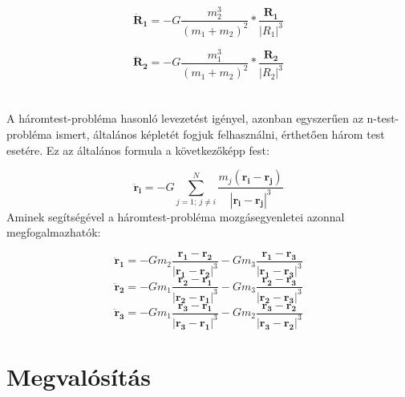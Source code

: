 \begin{multicols}{2}
\begin{equation} \label{eq:22}
    \boldsymbol{\ddot{R}_{1}}
    =
    - G \frac{m_{2}^{3}}{\left( m_{1} + m_{2} \right)^{2}} * \frac{\boldsymbol{R_{1}}}{\left| R_{1} \right|^{3}} 
\end{equation}

\begin{equation} \label{eq:23}
    \boldsymbol{\ddot{R}_{2}}
    =
    - G \frac{m_{1}^{3}}{\left( m_{1} + m_{2} \right)^{2}} * \frac{\boldsymbol{R_{2}}}{\left| R_{2} \right|^{3}}
\end{equation}
\\ \\
A háromtest-probléma hasonló levezetést igényel, azonban egyszerűen az n-test-probléma ismert, általános képletét fogjuk felhasználni, érthetően három test esetére. Ez az általános formula a következőképp fest:

\begin{equation}
    \boldsymbol{\ddot{r}_{i}}
    =
    - G \sum_{j = 1;\ j \neq i}^{N} \frac{m_{j} \left( \boldsymbol{r_{i}} - \boldsymbol{r_{j}} \right)}{\left| \boldsymbol{r_{i}} - \boldsymbol{r_{j}} \right|^{3}}
\end{equation}
Aminek segítségével a háromtest-probléma mozgásegyenletei azonnal megfogalmazhatók:

\begin{equation}
    \boldsymbol{\ddot{r}_{1}}
    =
    - G m_{2} \frac{\boldsymbol{r_{1}} - \boldsymbol{r_{2}}}{\left| \boldsymbol{r_{1}} - \boldsymbol{r_{2}} \right|^{3}}
    - G m_{3} \frac{\boldsymbol{r_{1}} - \boldsymbol{r_{3}}}{\left| \boldsymbol{r_{1}} - \boldsymbol{r_{3}} \right|^{3}}
\end{equation}
\begin{equation}
    \boldsymbol{\ddot{r}_{2}}
    =
    - G m_{1} \frac{\boldsymbol{r_{2}} - \boldsymbol{r_{1}}}{\left| \boldsymbol{r_{2}} - \boldsymbol{r_{1}} \right|^{3}}
    - G m_{3} \frac{\boldsymbol{r_{2}} - \boldsymbol{r_{3}}}{\left| \boldsymbol{r_{2}} - \boldsymbol{r_{3}} \right|^{3}}
\end{equation}
\begin{equation}
    \boldsymbol{\ddot{r}_{3}}
    =
    - G m_{1} \frac{\boldsymbol{r_{3}} - \boldsymbol{r_{1}}}{\left| \boldsymbol{r_{3}} - \boldsymbol{r_{1}} \right|^{3}}
    - G m_{2} \frac{\boldsymbol{r_{3}} - \boldsymbol{r_{2}}}{\left| \boldsymbol{r_{3}} - \boldsymbol{r_{2}} \right|^{3}}
\end{equation}

\section{Megvalósítás}

\end{multicols}